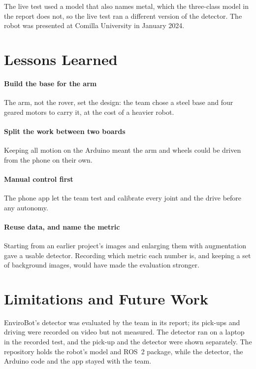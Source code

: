 \documentclass[11pt]{article}
\begin{document}
The live test used a model that also names metal, which the three-class model in the report does not, so the live test ran a different version of the detector. The robot was presented at Comilla University in January 2024.

\section{Lessons Learned}

\paragraph{Build the base for the arm} The arm, not the rover, set the design: the team chose a steel base and four geared motors to carry it, at the cost of a heavier robot.

\paragraph{Split the work between two boards} Keeping all motion on the Arduino meant the arm and wheels could be driven from the phone on their own.

\paragraph{Manual control first} The phone app let the team test and calibrate every joint and the drive before any autonomy.

\paragraph{Reuse data, and name the metric} Starting from an earlier project's images and enlarging them with augmentation gave a usable detector. Recording which metric each number is, and keeping a set of background images, would have made the evaluation stronger.

\section{Limitations and Future Work}
\label{sec:future}

EnviroBot's detector was evaluated by the team in its report; its pick-ups and driving were recorded on video but not measured. The detector ran on a laptop in the recorded test, and the pick-up and the detector were shown separately. The repository holds the robot's model and ROS~2 package, while the detector, the Arduino code and the app stayed with the team.
\end{document}
